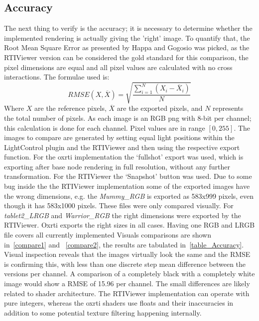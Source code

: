 \subsection{Accuracy}
The next thing to verify is the accuracy; it is necessary to determine whether
the implemented rendering is actually giving the 'right' image. To quantify that, the Root Mean Square Error as presented
by Happa and Gogosio\cite*{gogioso_pbr:_2017} was picked, as the RTIViewer
version can be considered the gold standard for this comparison, the pixel dimensions
are equal and all pixel values are calculated with no cross
interactions. The formulae used is:
$$RMSE(X, \overline X )= \sqrt{\frac{\sum_{i=1}^{N} (X_{i}-\overline
    X_{i})}{N}}$$
Where $X$ are the reference pixels, $\overline X$ are the exported pixels, and
$N$ represents the total number of pixels. As each image is an RGB png with
8-bit per channel; this calculation is done for each channel. Pixel values are
in range $[0, 255]$. The images to compare are generated by setting equal light
positions within the LightControl plugin and the RTIViewer and then using the
respective export function. For the oxrti implementation the `fullshot' export
was used, which is exporting after base node rendering in full resolution,
without any further transformation. For the RTIViewer the `Snapshot' button was
used. Due to some bug inside the the RTIViewer implementation some of the
exported images have the wrong dimensions, e.g. the \emph{Mummy\_RGB} is exported
as 583x999 pixels, even though it has 583x1000 pixels. These files were only
compared visually. For \emph{tablet2\_LRGB} and \emph{Warrior\_RGB} the right
dimensions were exported by the RTIViewer. Oxrti exports the right sizes in all
cases. Having one RGB and LRGB file covers all currently implemented  Visuals
comparisons are shown in~\autoref{compare1} and ~\autoref{compare2}, the results
are tabulated in~\autoref{table_Accuracy}. Visual inspection reveals that the
images virtually look the same and the RMSE is confirming this, with less than
one discrete step mean difference between the versions per channel. A
comparison of a completely black with a completely white image would show a RMSE
of 15.96 per channel. The small differences are likely related to shader
architecture. The RTIViewer implementation can operate with pure integers,
whereas the oxrti shaders use floats and their inaccuracies in addition to some
potential texture filtering happening internally.

